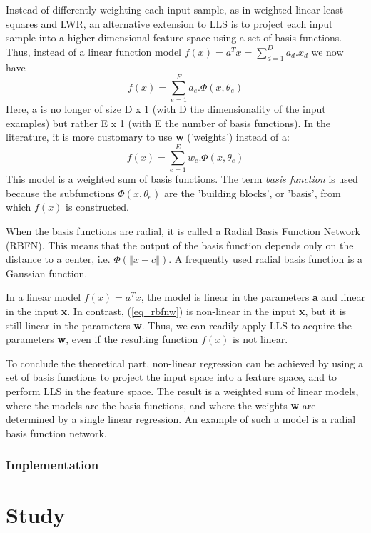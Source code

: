 \documentclass[pdftex,a4paper,11pt]{report}
\begin{document}
Instead of differently weighting each input sample, as in weighted linear least squares and LWR, an alternative extension to LLS is to project each input sample into a higher-dimensional feature space using a set of basis functions.
Thus, instead of a linear function model $f(x) = a^Tx = \sum_{d=1}^{D}a_d.x_d$ we now have
\begin{equation}
	f(x) = \sum_{e=1}^{E}a_e.\Phi(x, \theta_e)
\end{equation}
Here, a is no longer of size D x 1 (with D the dimensionality of the input examples) but rather E x 1 (with E the number of basis functions).
In the literature, it is more customary to use \textbf{w} ('weights') instead of a:
\begin{equation}
\label{eq_rbfnw}
	f(x) = \sum_{e=1}^{E}w_e.\Phi(x, \theta_e)
\end{equation}
This model is a weighted sum of basis functions. The term \textit{basis function} is used because the subfunctions $\Phi(x, \theta_e)$ are the 'building blocks', or 'basis', from which $f(x)$ is constructed.

When the basis functions are radial, it is called a Radial Basis Function Network (RBFN). This means that the output of the basis function depends only on the distance to a center, i.e. $\Phi(\left\Vert x - c\right\Vert)$. A frequently used radial basis function is a Gaussian function.

In a linear model $f(x) = a^Tx$, the model is linear in the parameters \textbf{a} and linear in the input \textbf{x}.
In contrast, (\ref{eq_rbfnw}) is non-linear in the input \textbf{x}, but it is still linear in the parameters \textbf{w}. Thus, we can readily apply LLS to acquire the parameters \textbf{w}, even if the resulting function $f(x)$ is not linear.

To conclude the theoretical part, non-linear regression can be achieved by using a set of basis functions to project the input space into a feature space, and to perform LLS in the feature space. The result is a weighted sum of linear models, where the models are the basis functions, and where the weights \textbf{w} are determined by a single linear regression. An example of such a model is a radial basis function network. 

\subsection{Implementation}

\chapter{Study}
\end{document}
